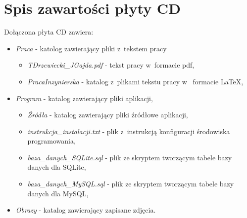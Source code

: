 \chapter{Spis zawartości płyty CD}
\label{cha:zawartoscCD}

Dołączona płyta CD zawiera:
\begin{itemize}
\item \emph{Praca} - katolog zawierający pliki z~tekstem pracy
\begin{itemize}
\item \emph{TDrzewiecki\_JGajda.pdf} - tekst pracy w~formacie pdf,
\item \emph{PracaInzynierska} - katalog z~plikami tekstu pracy w~ formacie LaTeX,
\end{itemize}
\item \emph{Program} - katalog zawierający pliki aplikacji,
\begin{itemize}
\item \emph{Źródła} - katalog zawierający pliki źródłowe aplikacji,
\item \emph{instrukcja\_instalacji.txt} - plik z~instrukcją konfiguracji środowiska programowania,
\item \emph{baza\_danych\_SQLite.sql} - plik ze skryptem tworzącym tabele bazy danych dla SQLite,
\item \emph{baza\_danych\_MySQL.sql} - plik ze skryptem tworzącym tabele bazy danych dla MySQL,
\end{itemize}
\item \emph{Obrazy} - katalog zawierający zapisane zdjęcia.
\end{itemize}
